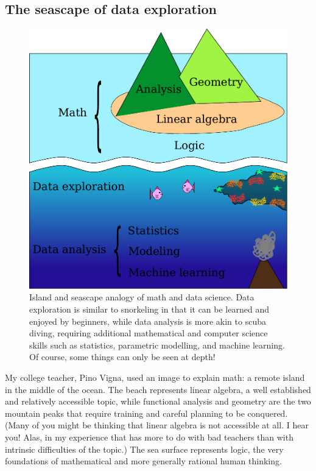 \documentclass[12pt,a4paper,notitlepage,onecolumn]{article}
\begin{document}
\subsection{The seascape of data exploration}
\begin{figure}
\begin{center}
\includegraphics[width=0.5\linewidth]{island.pdf}
\caption{Island and seascape analogy of math and data science. Data exploration is similar to snorkeling in that it can be learned and enjoyed by beginners, while data analysis is more akin to scuba diving, requiring additional mathematical and computer science skills such as statistics, parametric modelling, and machine learning. Of course, some things can only be seen at depth!}
\label{fig:island}
\end{center}
\end{figure}
My college teacher, Pino Vigna, used an image to explain math: a remote island in the middle of the ocean. The beach represents linear algebra, a well established and relatively accessible topic, while functional analysis and geometry are the two mountain peaks that require training and careful planning to be conquered. (Many of you might be thinking that linear algebra is not accessible at all. I hear you! Alas, in my experience that has more to do with bad teachers than with intrinsic difficulties of the topic.) The sea surface represents logic, the very foundations of mathematical and more generally rational human thinking.
\end{document}
